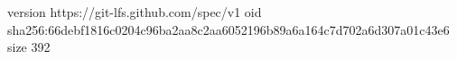 version https://git-lfs.github.com/spec/v1
oid sha256:66debf1816c0204c96ba2aa8c2aa6052196b89a6a164c7d702a6d307a01c43e6
size 392
